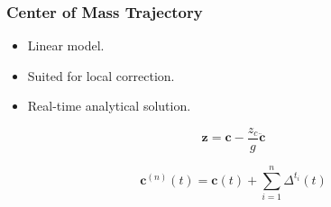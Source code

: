 \documentclass[14pt,utf8,hyperref={pdfpagelabels=false}]{beamer}
\begin{document}
\begin{slideAction}
  \frametitle{Center of Mass Trajectory}


  \begin{changeleftmargin}{1.1cm}
    \begin{itemize}
    \item Linear model.
    \item Suited for local correction.
    \item Real-time analytical solution.
    \end{itemize}
    
    \begin{equation*}
      \mathbf{z} = \mathbf{c} - \frac{z_c}{g} \ddot{\mathbf{c}}
    \end{equation*}
    
    \begin{equation*}
      \mathbf{c}^{(n)}(t) = \mathbf{c}(t)  + \sum_{i=1}^n \Delta^{t_i}(t)
    \end{equation*}
  \end{changeleftmargin}
\end{slideAction}



\end{document}

